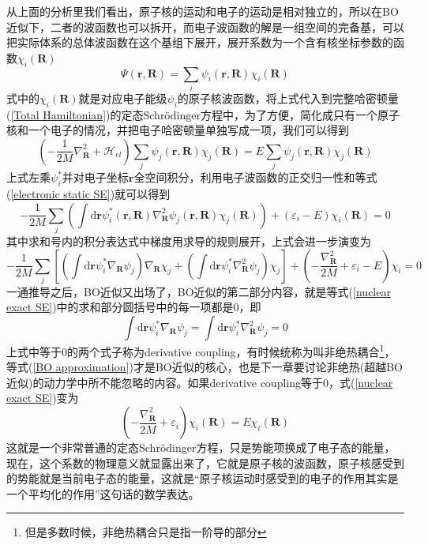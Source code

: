 \documentclass[12pt,a4paper,openany,twoside]{book}
\numberwithin{equation}{section}
\begin{document}
    从上面的分析里我们看出，原子核的运动和电子的运动是相对独立的，所以在BO近似下，二者的波函数也可以拆开，而电子波函数的解是一组空间的完备基，可以把实际体系的总体波函数在这个基组下展开，展开系数为一个含有核坐标参数的函数$ \chi_i(\mathbf{R})$
    \begin{equation}
      \Psi(\mathbf{r,R})=\sum_{i}\psi_i(\mathbf{r,R}) \chi_i(\mathbf{R})
    \end{equation}
    式中的$\chi_i(\mathbf{R})$就是对应电子能级$\psi_i$的原子核波函数，将上式代入到完整哈密顿量(\ref{Total Hamiltonian})的定态Schr\"odinger方程中，为了方便，简化成只有一个原子核和一个电子的情况，并把电子哈密顿量单独写成一项，我们可以得到
    \begin{equation}
      \left(- \frac { 1 } { 2 M } \nabla _ {\mathbf{R} } ^ { 2 } +\mathscr { H } _{el} \right)\sum_{j}\psi_j(\mathbf{r,R}) \chi_j(\mathbf{R}) = E\sum_{j}\psi_j(\mathbf{r,R}) \chi_j(\mathbf{R})
    \end{equation}
    上式左乘$\psi_i^*$并对电子坐标$\mathbf{r}$全空间积分，利用电子波函数的正交归一性和等式(\ref{electronic static SE})就可以得到
    \begin{equation}
      -\frac{1}{2M}\sum_j \left(\int \mathrm{d}\mathbf{r} \psi_i^*(\mathbf{r,R})\nabla _ { \mathbf{R}} ^ { 2 }\psi_j(\mathbf{r,R})\chi_j(\mathbf{R} )\right)+(\varepsilon_i - E)\chi_i(\mathbf{R} ) = 0
    \end{equation}
    其中求和号内的积分表达式中梯度用求导的规则展开，上式会进一步演变为
    \begin{equation}
      -\frac{1}{2M}\sum_j\left[\left(\int \mathrm{d}\mathbf{r}\psi_i^*\nabla _ { \mathbf{R}}\psi_j \right) \nabla _ { \mathbf{R}}\chi_j + \left(\int \mathrm{d}\mathbf{r}\psi_i^*\nabla _ { \mathbf{R}}^2\psi_j \right)\chi_j \right]+\left(-\frac{\nabla _ { \mathbf{R}}^2}{2M} + \varepsilon_i -E\right)\chi_i = 0
      \label{nuclear exact SE}
    \end{equation}
    一通推导之后，BO近似又出场了，BO近似的第二部分内容，就是等式(\ref{nuclear exact SE})中的求和部分圆括号中的每一项都是0，即
    \begin{equation}
      \int \mathrm{d}\mathbf{r}\psi_i^*\nabla _ { \mathbf{R}}\psi_j = \int \mathrm{d}\mathbf{r}\psi_i^*\nabla _ { \mathbf{R}}^2\psi_j = 0
      \label{BO approximation}
    \end{equation}
    上式中等于0的两个式子称为derivative coupling，有时候统称为叫非绝热耦合\footnote{但是多数时候，非绝热耦合只是指一阶导的部分}，等式(\ref{BO approximation})才是BO近似的核心，也是下一章要讨论非绝热(超越BO近似)的动力学中所不能忽略的内容。如果derivative coupling等于0，式(\ref{nuclear exact SE})变为
    \begin{equation}
      \left(-\frac{\nabla _ { \mathbf{R}}^2}{2M} + \varepsilon_i\right)\chi_i(\mathbf{R}) = E\chi_i(\mathbf{R})
    \end{equation}
    这就是一个非常普通的定态Schr\"odinger方程，只是势能项换成了电子态的能量，现在，这个系数的物理意义就显露出来了，它就是原子核的波函数，原子核感受到的势能就是当前电子态的能量，这就是“原子核运动时感受到的电子的作用其实是一个平均化的作用”这句话的数学表达。
\end{document}
